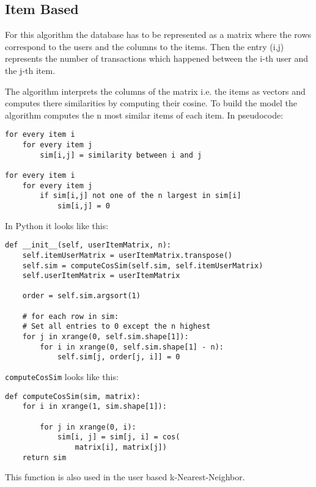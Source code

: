 \subsection{Item Based}
\label{itembasedknn}

For this algorithm the database has to be represented as a matrix
where the rows correspond to the users and the columns to the items.
Then the entry (i,j) represents the number of transactions which happened
between the i-th user and the j-th item. 

The algorithm interprets the columns of the matrix i.e. the items
as vectors and computes there similarities by computing their cosine.
To build the model the algorithm computes the n most similar items
of each item. In pseudocode:
\begin{lstlisting}[style=pseudocode]
for every item i
    for every item j
        sim[i,j] = similarity between i and j

for every item i
    for every item j
        if sim[i,j] not one of the n largest in sim[i]
            sim[i,j] = 0
\end{lstlisting}
In Python it looks like this:
\begin{lstlisting}[style=python]
def __init__(self, userItemMatrix, n):
    self.itemUserMatrix = userItemMatrix.transpose()
    self.sim = computeCosSim(self.sim, self.itemUserMatrix)
    self.userItemMatrix = userItemMatrix

    order = self.sim.argsort(1)

    # for each row in sim:
    # Set all entries to 0 except the n highest
    for j in xrange(0, self.sim.shape[1]):
        for i in xrange(0, self.sim.shape[1] - n):
            self.sim[j, order[j, i]] = 0
\end{lstlisting}
\lstinline!computeCosSim! looks like this:
\begin{lstlisting}[style=python]
def computeCosSim(sim, matrix):
    for i in xrange(1, sim.shape[1]):

        for j in xrange(0, i):
            sim[i, j] = sim[j, i] = cos(
                matrix[i], matrix[j])
    return sim
\end{lstlisting}
This function is also used in the user based k-Nearest-Neighbor.


